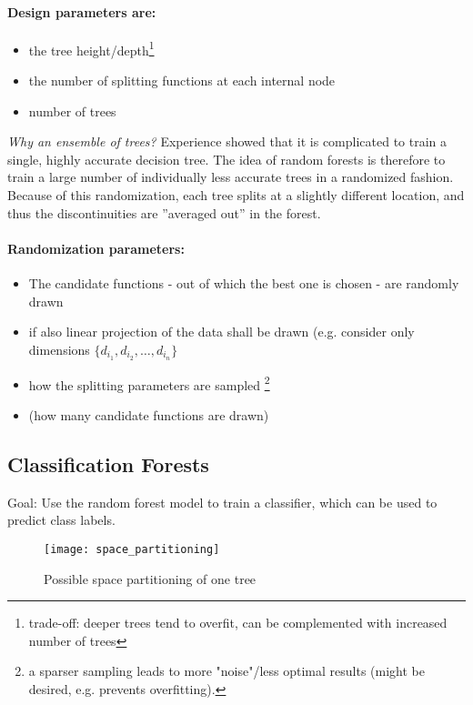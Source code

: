 \paragraph{Design parameters are:}
\begin{itemize}
  \item the tree height/depth\footnote{ trade-off: deeper trees tend to overfit, can be complemented with increased number of trees}
  \item the number of splitting functions at each internal node
  \item number of trees
\end{itemize}

\textit{Why an ensemble of trees?} Experience showed that it is complicated to train a single, highly accurate decision tree. The idea of random forests is therefore to train a large number of individually less accurate trees in a randomized fashion. Because of this randomization, each tree splits at a slightly different location, and thus the discontinuities are ”averaged out” in the forest.

\paragraph{Randomization parameters:}
\begin{itemize}
  \item The candidate functions - out of which the best one is chosen - are randomly drawn
  \item if also linear projection of the data shall be drawn (e.g. consider only dimensions \(\{d_{i_1}, d_{i_2}, \dots, d_{i_n}\}\)
  \item how the splitting parameters are sampled \footnote{a sparser sampling leads to more "noise"/less optimal results (might be desired, e.g. prevents overfitting).}
  \item (how many candidate functions are drawn)
\end{itemize}

\newpage
\subsection*{Classification Forests}
Goal: Use the random forest model to train a classifier, which can be used to predict class labels.

\begin{figure}[H]
  \centering
  \texttt{[image: space\_partitioning]}
  \caption{Possible space partitioning of one tree}
\end{figure}

